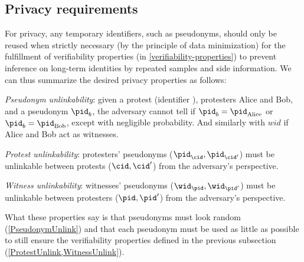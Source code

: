 \subsection{Privacy requirements}%
\label{privacy-properties}

For privacy, any temporary identifiers, such as pseudonyms, should only be 
reused when strictly necessary (by the principle of data minimization) for the 
fulfillment of verifiability properties (in \cref{verifiability-properties}) to 
prevent inference on long-term identities by repeated samples and side 
information.
We can thus summarize the desired privacy properties as follows:
\begin{requirements}[P]
\item\label{PseudonymUnlink} \emph{Pseudonym unlinkability}: given a protest 
  (identifier \cid), protesters Alice and Bob, and a pseudonym \(\pid_b\), the 
  adversary cannot tell if \(\pid_b = \pid_{\text{Alice}}\) or \(\pid_b = 
    \pid_{\text{Bob}}\), except with negligible probability. And similarly with $wid$ if Alice and Bob act as witnesses.
\item\label{ProtestUnlink} \emph{Protest unlinkability}: protesters' pseudonyms 
  (\(\pid_\cid, \pid_{\cid'}\)) must be unlinkable between protests (\(\cid, 
    \cid'\)) from the adversary's perspective.
\item\label{WitnessUnlink}\emph{Witness unlinkability}:  witnesses' pseudonyms 
  (\(\wid_\pid, \wid_{\pid'}\)) must be unlinkable between protesters (\(\pid, 
    \pid'\)) from the adversary's perspective.
\end{requirements}

What these properties say is that pseudonyms must look random 
(\cref{PseudonymUnlink}) and that each pseudonym must be used as little as possible to still ensure the verifiability properties defined in the previous subsection
(\cref{ProtestUnlink,WitnessUnlink}).
